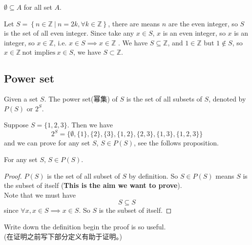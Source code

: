 \documentclass[
	UTF-8,
	11pt, %
	a4paper, %
]{LegrandOrangeBook}
\begin{document}
\begin{remark}
	$\emptyset \subseteq A$ for all set $A$.
\end{remark}

\begin{example}
	Let $S= \left\{ n \in \mathbb{Z} \ | \ n = 2k, \forall k \in \mathbb{Z} \right\}$, there are means $n$ 
	are the even integer, so $S$ is the set of all even integer. Since take any $x \in S$, $x$ is an even integer,
	so $x$ is an integer, so $x \in \mathbb{Z}$, i.e. $x \in S \implies x \in \mathbb{Z}$ .
	We have $S \subseteq \mathbb{Z}$, and $1 \in \mathbb{Z}$ but $1 \notin S$, 
	so $x\in \mathbb{Z} \ \text{not implies} \ x \in S$, we have $S \subset \mathbb{Z}$.
\end{example}

\newpage

\subsection{Power set}

\begin{definition}
	Given a set $S$. The power set(幂集) of $S$ is the set of all subsets of $S$, denoted by $P(S)$ or $2^S$.
\end{definition}

\begin{example}
	Suppose $S = \{1, 2, 3\}$. Then we have
	$$2^S = \{\emptyset, \{1\} , \{2\} , \{3\} , \{1, 2\} , \{2, 3\} , \{1, 3\} , \{1, 2, 3\}\}$$
	and we can prove for any set $S$, $S \in P(S)$, see the follows proposition.
\end{example}

\begin{proposition}
	For any set $S$, $S \in P(S)$.
\end{proposition}

\begin{proof}
	$P(S)$ is the set of all subset of $S$ by definition. So $S \in P(S)$ means $S$ 
	is the subset of itself (\textbf{This is the aim we want to prove}). \\

	Note that we must have
	$$S \subseteq S$$
	since $\forall x, x \in S \implies x \in S $. So $S$ is the subset of itself.
\end{proof}

\begin{remark}
	Write down the definition begin the proof is so useful.\\
	(在证明之前写下部分定义有助于证明。)
\end{remark}
\end{document}
